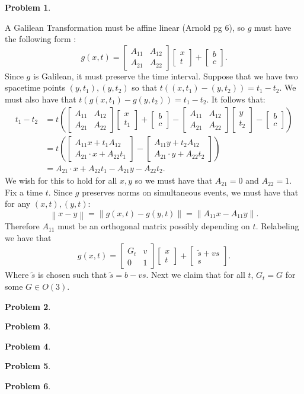 \documentclass[12pt, a4paper]{article}
\title{}
\author{A.N.}
\date{\today}
\newtheorem{problem}{Problem}
\theoremstyle{definition}
\newcommand{\norm}[1]{\left\lVert#1\right\rVert}
\newcommand{\bmat}[1]{\begin{bmatrix}#1\end{bmatrix}}
\begin{document}
\begin{problem}
\end{problem}
A Galilean Transformation must be affine linear (Arnold pg 6), so $g$ must have the following form : 
$$g(x,t) = \bmat{A_{11} & A_{12} \\ A_{21}  & A_{22}} \bmat{x \\ t} + \bmat{b\\c }.$$ 
Since $g$ is Galilean, it must preserve the time interval. Suppose that we have two spacetime points $(y,t_1), (y,t_2)$ so that $t( (x,t_1) -(y,t_2)  ) = t_1 - t_2$. We must also have that $t(g(x,t_1) - g(y, t_2)) = t_1 - t_2$. It follows that:
\begin{align*}t_1 - t_2 & = t \left( \bmat{A_{11} & A_{12} \\ A_{21}  & A_{22}} \bmat{x \\ t_1 } + \bmat{b\\c }  - \bmat{A_{11} & A_{12} \\ A_{21}  & A_{22}} \bmat{y \\ t_2} - \bmat{b\\c }\right)
	\\ & = t\left( \bmat{A_{11} x + t_1 A_{12} \\ A_{21} \cdot x + A_{22} t_1} - \bmat{A_{11} y + t_2 A_{12} \\ A_{21} \cdot y + A_{22} t_2} \right) 
	\\ & =A_{21} \cdot x + A_{22} t_1 - A_{21} y- A_{22} t_2.
\end{align*}
We wish for this to hold for all $x,y$  so we must have that $A_{21} = 0$ and $A_{22} = 1$. Fix a time $t$. Since $g$ preserves norms on simultaneous events, we must have that for any $(x,t), (y,t)$:
$$\norm{x- y} = \norm{g(x,t) - g(y,t)} = \norm{A_{11}x - A_{11} y}.$$
Therefore $A_{11}$ must be an orthogonal matrix possibly depending on $t$. Relabeling we have that 
$$g(x,t) = \bmat{G_t & v \\ 0 & 1 } \bmat{x\\t} + \bmat{ \tilde{s} + vs \\ s}. $$ 
Where $\tilde{s}$ is chosen such that $\tilde{s} = b - vs$. Next we claim that for all $t$, $G_t = G$ for some $G\in O(3)$. 
\newpage
\begin{problem}
\end{problem}
\newpage
\begin{problem}
\end{problem}
\newpage
\begin{problem}
\end{problem}
\newpage
\begin{problem}
\end{problem}
\newpage
\begin{problem}
\end{problem}
\newpage
\end{document}
